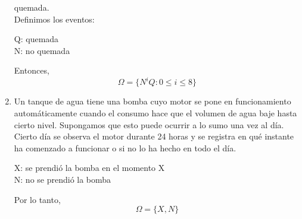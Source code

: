 \begin{enumerate}
        quemada.\vspace{3mm}\\
            Definimos los eventos:
            \begin{center}
                Q: quemada\\
                N: no quemada
            \end{center}
            Entonces,
            \[\Omega=\{N^iQ:0\leq i\leq8\}\]
        \item Un tanque de agua tiene una bomba cuyo motor se pone en funcionamiento automáticamente cuando el consumo
        hace que el volumen de agua baje hasta cierto nivel. Supongamos que esto puede ocurrir a lo sumo una vez al
        día. Cierto día se observa el motor durante 24 horas y se registra en qué instante ha comenzado a funcionar o
        si no lo ha hecho en todo el día.\vspace{3mm}
            \begin{center}
                X: se prendió la bomba en el momento X\\
                N: no se prendió la bomba
            \end{center}
            Por lo tanto,
            \[\Omega=\{X,N\}\]
    \end{enumerate}